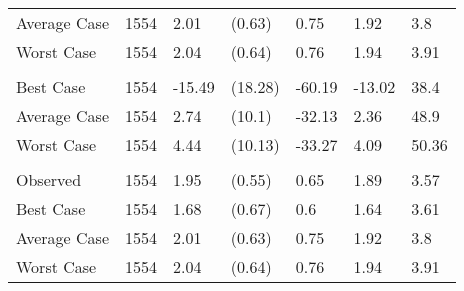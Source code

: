 \begin{tabular}[t]{lllllll}
\hspace{1em}\hspace{1em}Average Case & 1554 & 2.01 & (0.63) & 0.75 & 1.92 & \vphantom{1} 3.8\\
\hspace{1em}\hspace{1em}Worst Case & 1554 & 2.04 & (0.64) & 0.76 & 1.94 & \vphantom{1} 3.91\\
\addlinespace[0.3em]
\multicolumn{7}{l}{\textbf{\% Change Average Price}}\\
\hspace{1em}\hspace{1em}Best Case & 1554 & -15.49 & (18.28) & -60.19 & -13.02 & 38.4\\
\hspace{1em}\hspace{1em}Average Case & 1554 & 2.74 & (10.1) & -32.13 & 2.36 & 48.9\\
\hspace{1em}\hspace{1em}Worst Case & 1554 & 4.44 & (10.13) & -33.27 & 4.09 & 50.36\\
\addlinespace[0.3em]
\multicolumn{7}{l}{\textbf{Median Price}}\\
\hspace{1em}\hspace{1em}Observed & 1554 & 1.95 & (0.55) & 0.65 & 1.89 & 3.57\\
\hspace{1em}\hspace{1em}Best Case & 1554 & 1.68 & (0.67) & 0.6 & 1.64 & 3.61\\
\hspace{1em}\hspace{1em}Average Case & 1554 & 2.01 & (0.63) & 0.75 & 1.92 & 3.8\\
\hspace{1em}\hspace{1em}Worst Case & 1554 & 2.04 & (0.64) & 0.76 & 1.94 & 3.91\\
\bottomrule
\end{tabular}
